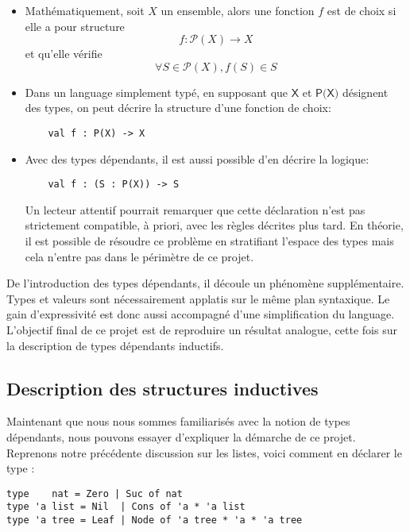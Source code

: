\documentclass[11pt]{article}
\begin{document}
\begin{itemize}
\item Mathématiquement, soit \(X\) un ensemble, alors une fonction \(f\) est de choix si elle a pour structure \[ f : \mathcal{P}(X) \to X    \] et qu'elle vérifie \[\forall S \in \mathcal{P}(X), f(S) \in S\]

\item Dans un language simplement typé, en supposant que \(\textsf{X}\) et \(\textsf{P(X)}\) désignent des types, on peut décrire la structure d'une fonction de choix:

\begin{verbatim}
    val f : P(X) -> X
\end{verbatim}

\item Avec des types dépendants, il est aussi possible d'en décrire la logique:

\begin{verbatim}
    val f : (S : P(X)) -> S
\end{verbatim}

Un lecteur attentif pourrait remarquer que cette déclaration n'est pas strictement compatible, à priori, avec les règles décrites plus tard. En théorie, il est possible de résoudre ce problème en stratifiant l'espace des types mais cela n'entre pas dans le périmètre de ce projet.
\end{itemize}

De l'introduction des types dépendants, il découle un phénomène supplémentaire. Types et valeurs sont nécessairement applatis sur le même plan syntaxique. Le gain d'expressivité est donc aussi accompagné d'une simplification du language. L'objectif final de ce projet est de reproduire un résultat analogue, cette fois sur la description de types dépendants inductifs.

\subsection{Description des structures inductives}
\label{sec:org90e38b3}

Maintenant que nous nous sommes familiarisés avec la notion de types dépendants, nous pouvons essayer d'expliquer la démarche de ce projet. Reprenons notre précédente discussion sur les listes, voici comment en déclarer le type :

\begin{verbatim}
type    nat = Zero | Suc of nat
type 'a list = Nil  | Cons of 'a * 'a list
type 'a tree = Leaf | Node of 'a tree * 'a * 'a tree
\end{verbatim}
\end{document}
